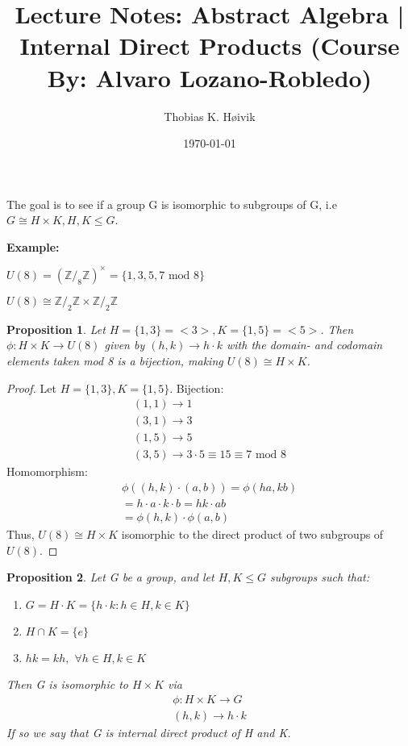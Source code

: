 \documentclass[12pt]{article}
\title{Lecture Notes: Abstract Algebra | Internal Direct Products (Course By: Alvaro Lozano-Robledo)}
\author{Thobias K. Høivik}
\date{\today}
\newtheorem{proposition}{Proposition}
\begin{document}
\maketitle
\noindent
The goal is to see if a group G is isomorphic to subgroups of G, 
i.e \(G \cong H \times K, H,K \leq G\).

\noindent
\textbf{Example:}

\noindent 
\(U(8) = (\mathbb Z /_8 \mathbb Z)^\times = \{1,3,5,7 \text{ mod } 8\}\)

\noindent 
\(
    U(8) \cong \mathbb Z/_2 \mathbb Z \times 
    \mathbb Z /_2 \mathbb Z
\)

\noindent 
\begin{proposition}
    Let \(H = \{1,3\} = <3>, K = \{1,5\} = <5>\). 
    Then \(\phi: H\times K \to U(8)\) given by 
    \((h,k) \to h \cdot k\) with the domain- and codomain elements 
    taken mod 8 is a bijection, making \(U(8) \cong H\times K\). 
\end{proposition}

\begin{proof}
    Let \(H = \{1,3\}, K = \{1,5\}\).
    Bijection: 
    \begin{gather*}
        (1,1) \to 1 \\ 
        (3,1) \to 3 \\ 
        (1,5) \to 5 \\ 
        (3,5) \to 3 \cdot 5 \equiv 15 \equiv 7 \text{ mod } 8
    \end{gather*}
    Homomorphism:
    \begin{gather*}
        \phi((h,k) \cdot (a, b)) = \phi(ha, kb) \\ 
        = h\cdot a \cdot k \cdot b = hk \cdot ab \\ 
        = \phi(h,k) \cdot \phi(a,b)
    \end{gather*}
    Thus, \(U(8) \cong H \times K\) isomorphic to the direct 
    product of two subgroups of \(U(8)\).
\end{proof}

\break 
\begin{proposition}
    Let G be a group, and let \(H,K \leq G\) subgroups such that: 
    \begin{enumerate}
        \item \(G = H\cdot K = \{h\cdot k : h\in H, k \in K\}\)
        \item \(H \cap K = \{e\}\)
        \item \(hk = kh,\) \(\forall h \in H, k \in K\)
    \end{enumerate}
    Then G is isomorphic to \(H \times K\) via 
    \begin{gather*}
        \phi: H \times K \to G \\ 
        (h,k) \to h \cdot k
    \end{gather*}
    If so we say that G is internal direct product of H and K.

\end{proposition}
\end{document}
